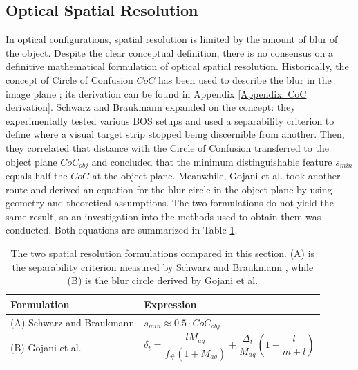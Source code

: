 \subsection{Optical Spatial Resolution}
\label{subsection: Optical Spatial Resolution}
\par In optical configurations, spatial resolution is limited by the amount of blur of the object. Despite the clear conceptual definition, there is no consensus on a definitive mathematical formulation of optical spatial resolution. Historically, the concept of Circle of Confusion $CoC$ has been used to describe the blur in the image plane \cite{Greenleaf1950}; its derivation can be found in Appendix \ref{Appendix: CoC derivation}. Schwarz and Braukmann \cite{Schwarz&Braukmann} expanded on the concept: they experimentally tested various BOS setups and used a separability criterion to define where a visual target strip stopped being discernible from another. Then, they correlated that distance with the Circle of Confusion transferred to the object plane $CoC_{obj}$ and concluded that the minimum distinguishable feature $s_{min}$ equals half the $CoC$ at the object plane. Meanwhile, Gojani et al. \cite{Gojani&Obayashi} took another route and derived an equation for the blur circle in the object plane by using geometry and theoretical assumptions. The two formulations do not yield the same result, so an investigation into the methods used to obtain them was conducted. Both equations are summarized in Table \ref{tab: SR formulations}.

\begin{table}[htbp]
    \centering
    \caption[Spatial resolution formulations compared]{The two spatial resolution formulations compared in this section. (A) is the separability criterion measured by Schwarz and Braukmann \cite{Schwarz&Braukmann}, while (B) is the blur circle derived by Gojani et al. \cite{Gojani&Obayashi}}
    \label{tab: SR formulations}
    \begin{tabular}{ll}
        \toprule
        Formulation & Expression \\
        \midrule
        (A) Schwarz and Braukmann & $s_{min} \approx 0.5 \cdot CoC_{obj}$ \\[0.6em]
        (B) Gojani et al. & $\delta_t = \dfrac{lM_{ag}}{f_\#(1+M_{ag})} + \dfrac{\Delta_t}{M_{ag}} \left( 1 - \dfrac{l}{m+l}\right)$ \\[0.6em]
        \bottomrule
    \end{tabular}
\end{table}

